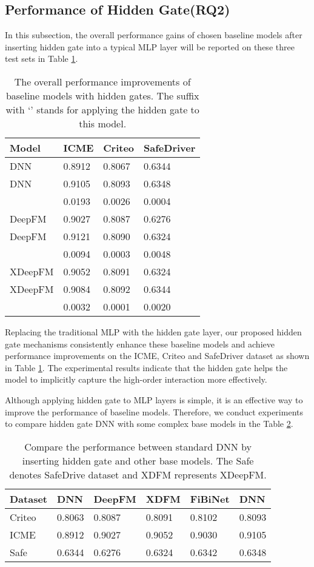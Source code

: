 \documentclass[sigconf,nonacm=true]{acmart}
\begin{document}
\subsection{Performance of Hidden Gate(RQ2)}
In this subsection, the overall performance gains of chosen baseline models after inserting hidden gate into a typical MLP layer will be reported on these three test sets in Table \ref{table:t4}. 

\begin{table}[!htbp]
  \centering
  \caption{The overall performance improvements of baseline models with hidden gates. The suffix with `' stands for applying the hidden gate to this model.}
  \label{table:t4}
  \begin{tabular}{llll}
  Model & ICME & Criteo & SafeDriver \\ \hline
  DNN & 0.8912 & 0.8067 & 0.6344 \\
  DNN  & 0.9105 & 0.8093 & 0.6348 \\
   & 0.0193 & 0.0026 & 0.0004 \\ \hline
  DeepFM & 0.9027 & 0.8087 & 0.6276 \\
  DeepFM  & 0.9121 & 0.8090 & 0.6324 \\
   & 0.0094 & 0.0003 & 0.0048 \\ \hline
  XDeepFM & 0.9052 & 0.8091 & 0.6324 \\
  XDeepFM  & 0.9084 & 0.8092 & 0.6344 \\
   & 0.0032 & 0.0001 & 0.0020 \tabularnewline \bottomrule 
  \end{tabular}
\end{table}

Replacing the traditional MLP with the hidden gate layer, our proposed hidden gate mechanisms
consistently enhance these baseline models and achieve performance improvements on the ICME, Criteo and SafeDriver dataset as shown in Table \ref{table:t4}. The experimental results indicate that the hidden gate helps the model to implicitly capture the high-order interaction more effectively.

Although applying hidden gate to MLP layers is simple, it is an effective way to improve the performance of baseline models. 
Therefore, we conduct experiments to compare hidden gate DNN with some complex base models in the Table \ref{table:t41}.

\begin{table}[!htbp]
\centering
\caption{Compare the performance between standard DNN by inserting hidden gate and other base models. The Safe denotes SafeDrive dataset and XDFM represents XDeepFM.}
\label{table:t41}
\begin{tabular}{llllll}
Dataset  & DNN & DeepFM & XDFM & FiBiNet & DNN \\ \hline
Criteo & 0.8063 & 0.8087 & 0.8091 & 0.8102 & 0.8093 \\
ICME  & 0.8912 & 0.9027 & 0.9052 & 0.9030 & 0.9105 \\
Safe  & 0.6344 & 0.6276 & 0.6324 & 0.6342 & 0.6348 \tabularnewline
  \bottomrule
\end{tabular}
\end{table}
\end{document}
